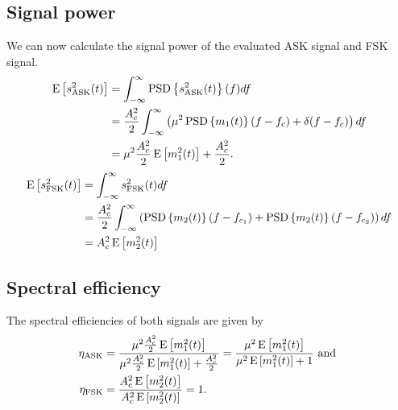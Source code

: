 \documentclass[11pt,titlepage]{report}
\begin{document}
\begin{appendices}
\subsection{Signal power}
We can now calculate the signal power of the evaluated ASK signal and FSK signal.
\begin{align*}
	\operatorname{E}\left[s_{\text{ASK}}^2(t)\right] &= \int_{-\infty}^{\infty} \operatorname{PSD}\left\{s_{\text{ASK}}^2(t)\right\}(f) df \\
	&= \frac{A_c^2}{2} \int_{-\infty}^{\infty}\left( \mu^2 \operatorname{PSD}\left\{m_1(t)\right\}(f-f_c) + \delta(f-f_c) \right) df \\
	&= \mu^2 \frac{A_c^2}{2}\operatorname{E}\left[m_1^2(t)\right] + \frac{A_c^2}{2}.
\end{align*}
\begin{align*}
	\operatorname{E}\left[s_{\text{FSK}}^2(t)\right] &= \int_{-\infty}^{\infty} s_{\text{FSK}}^2(t) df \\
	&= \frac{A_c^2}{2} \int_{-\infty}^{\infty} \left( \operatorname{PSD}\left\{m_2(t)\right\}(f-f_{c_1}) + \operatorname{PSD}\left\{m_2(t)\right\}(f-f_{c_2})\right) df \\
	&= A_c^2 \operatorname{E}\left[m_2^2(t)\right]
\end{align*}
\subsection{Spectral efficiency}
The spectral efficiencies of both signals are given by
\begin{align*}
	\eta_{\text{ASK}} &= \frac{\mu^2 \frac{A_c^2}{2}\operatorname{E}\left[m_1^2(t)\right]}{\mu^2 \frac{A_c^2}{2}\operatorname{E}\left[m_1^2(t)\right] + \frac{A_c^2}{2}} = \frac{\mu^2\operatorname{E}\left[m_1^2(t)\right]}{\mu^2\operatorname{E}\left[m_1^2(t)\right] + 1} \text{ and } \\
	\eta_{\text{FSK}} &= \frac{A_c^2 \operatorname{E}\left[m_2^2(t)\right]}{A_c^2 \operatorname{E}\left[m_2^2(t)\right]} = 1.
\end{align*}

\end{appendices}
\end{document}
